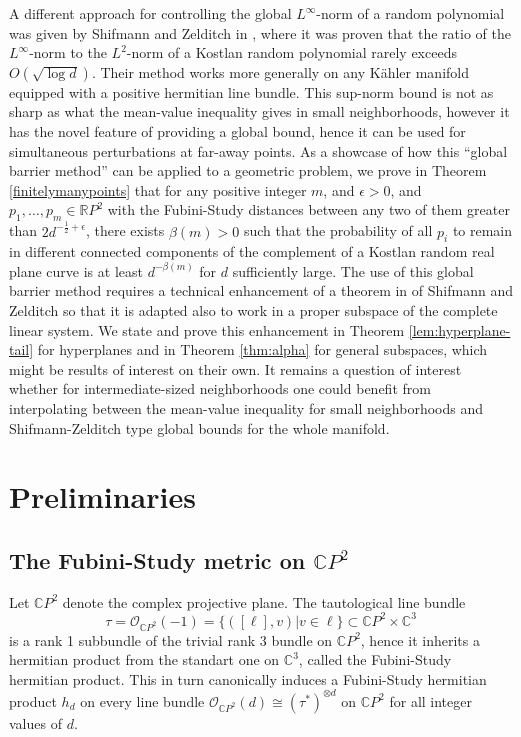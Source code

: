 \documentclass [11pt]{amsart}
\theoremstyle{remark}
\numberwithin{equation}{section}
\numberwithin{theorem}{section}
\begin{document}
A different approach for controlling the global $L^{\infty}$-norm of a random polynomial was given by Shifmann and Zelditch in \cite{SZ}, where it was proven that the ratio of the $L^{\infty}$-norm to the $L^2$-norm of a Kostlan random polynomial rarely exceeds $O(\sqrt{\log d})$. Their method works more generally on any K\"{a}hler manifold equipped with a positive hermitian line bundle. This sup-norm bound is not as sharp as what the mean-value inequality gives in small neighborhoods, however it has the novel feature of providing a global bound, hence it can be used for simultaneous perturbations at far-away points. As a showcase of how this ``global barrier method'' can be applied to a geometric problem, we prove in Theorem \ref{finitelymanypoints} that for any positive integer $m$, and $\epsilon>0$, and $\displaystyle{p_{1},\ldots,p_{m}\in \mathbb{R}P^2}$ with the Fubini-Study distances between any two of them greater than $2d^{-\frac{1}{2}+\epsilon}$, there exists $\beta(m)>0$ such that the probability of all $p_{i}$ to remain in different connected components of the complement of a Kostlan random real plane curve is at least $\displaystyle{d^{-\beta(m)}}$ for $d$ sufficiently large. The use of this global barrier method requires a technical enhancement of a theorem in \cite{SZ} of Shifmann and Zelditch so that it is adapted also to work in a proper subspace of the complete linear system. We state and prove this enhancement in Theorem \ref{lem:hyperplane-tail} for hyperplanes and in Theorem \ref{thm:alpha} for general subspaces, which might be results of interest on their own. It remains a question of interest whether for intermediate-sized neighborhoods one could benefit from interpolating between the mean-value inequality for small neighborhoods and Shifmann-Zelditch type global bounds for the whole manifold. 

\section{Preliminaries} \label{preliminaries} 

\subsection{The Fubini-Study metric on $\mathbb{C}P^2$} \label{FS}
Let $\mathbb{C}P^2$ denote the complex projective plane. The tautological line bundle 
$$\tau=\mathcal{O}_{\mathbb{C}P^{2}}(-1)=\{([\ell],v)| v\in \ell\}\subset \mathbb{C}P^2 \times \mathbb{C}^3$$is a rank 1 subbundle of the trivial rank $3$ bundle on $\mathbb{C}P^2$, hence it inherits a hermitian product from the standart one on $\mathbb{C}^3$, called the Fubini-Study hermitian product. This in turn canonically induces a Fubini-Study hermitian product $h_d$ on every line bundle $\mathcal{O}_{\mathbb{C}P^2}(d)\cong(\tau^{*})^{\otimes d}$ on $\mathbb{C}P^{2}$ for all integer values of $d$. 
\end{document}
